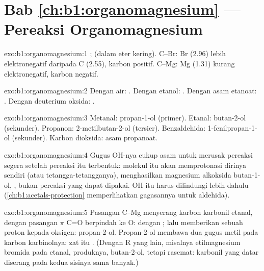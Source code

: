 \section*{Bab \ref{ch:b1:organomagnesium} --- Pereaksi Organomagnesium}

\begin{solution}{exo:b1:organomagnesium:1}
;  (dalam eter
kering). C--Br: Br (2.96) lebih elektronegatif daripada C (2.55), karbon
positif. C--Mg: Mg (1.31) kurang elektronegatif, karbon negatif.
\end{solution}

\begin{solution}{exo:b1:organomagnesium:2}
Dengan air: .
Dengan etanol: .
Dengan asam etanoat: .
Dengan deuterium oksida: .
\end{solution}

\begin{solution}{exo:b1:organomagnesium:3}
Metanal: propan-1-ol (primer). Etanal: butan-2-ol (sekunder). Propanon:
2-metilbutan-2-ol (tersier). Benzaldehida: 1-fenilpropan-1-ol (sekunder).
Karbon dioksida: asam propanoat.
\end{solution}

\begin{solution}{exo:b1:organomagnesium:4}
Gugus OH-nya cukup asam untuk merusak pereaksi segera setelah pereaksi
itu terbentuk: molekul itu akan memprotonasi dirinya sendiri (atau
tetangga-tetangganya), menghasilkan magnesium alkoksida butan-1-ol,
, bukan pereaksi yang dapat dipakai. OH itu harus
dilindungi lebih dahulu (\cref{ch:b1:acetals-protection} memperlihatkan
gagasannya untuk aldehida).
\end{solution}

\begin{solution}{exo:b1:organomagnesium:5}
Pasangan C--Mg menyerang karbon karbonil etanal, dengan pasangan $\pi$ C=O
berpindah ke O:  dengan ; lalu 
memberikan sebuah proton kepada oksigen: propan-2-ol. Propan-2-ol membawa
dua gugus metil pada karbon karbinolnya: zat itu . (Dengan R yang
lain, misalnya etilmagnesium bromida pada etanal, produknya, butan-2-ol,
 tetapi rasemat: karbonil yang datar diserang pada kedua sisinya
sama banyak.)
\end{solution}

